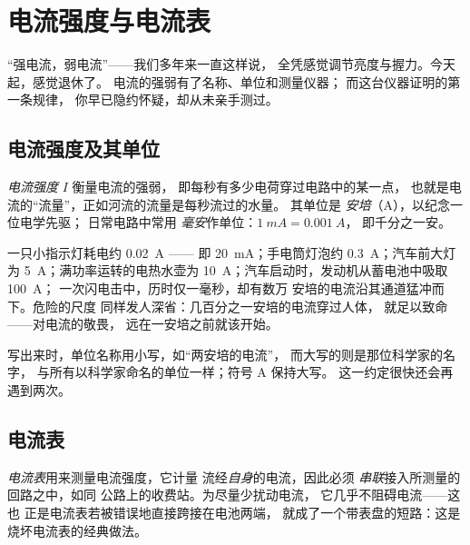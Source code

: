 \chapter{电流强度与电流表}\label{ch:g8:intensity-ammeter}

“强电流，弱电流”——我们多年来一直这样说，
全凭感觉调节亮度与握力。今天起，感觉退休了。
电流的强弱有了名称、单位和测量仪器；
而这台仪器证明的第一条规律，
你早已隐约怀疑，却从未亲手测过。

\section{电流强度及其单位}

\begin{definition}[电流强度]\label{def:g8:intensity-ammeter:intensity}
\emph{电流强度} $I$ 衡量电流的强弱，
即每秒有多少电荷穿过电路中的某一点，
也就是电流的“流量”，正如河流的流量是每秒流过的水量。
其单位是
\emph{安培}（\unit{A}），以纪念一位电学先驱；
日常电路中常用
\emph{毫安}作单位：$\qty{1}{mA} = \qty{0.001}{A}$，
即千分之一安。
\end{definition}

\begin{example}[常见电流的大小]\label{ex:g8:intensity-ammeter:values}
一只小指示灯耗电约 \qty{0.02}{A} ——
即 \qty{20}{mA}；手电筒灯泡约 \qty{0.3}{A}；汽车前大灯为
\qty{5}{A}；满功率运转的电热水壶为
\qty{10}{A}；汽车启动时，发动机从蓄电池中吸取 \qty{100}{A}；
一次闪电击中，历时仅一毫秒，却有数万
安培的电流沿其通道猛冲而下。危险的尺度
同样发人深省：几百分之一安培的电流穿过人体，
就足以致命——对电流的敬畏，
远在一安培之前就该开始。
\end{example}

\begin{remark}[人名与单位]\label{rem:g8:intensity-ammeter:person}
写出来时，单位名称用小写，如“两安培的电流”，
而大写的则是那位科学家的名字，
与所有以科学家命名的单位一样；符号 \unit{A} 保持大写。
这一约定很快还会再遇到两次。
\end{remark}

\section{电流表}

\begin{definition}[电流表]\label{def:g8:intensity-ammeter:ammeter}
\emph{电流表}用来测量电流强度，它计量
流经\emph{自身}的电流，因此必须
\emph{串联}接入所测量的回路之中，如同
公路上的收费站。为尽量少扰动电流，
它几乎不阻碍电流——这也
正是电流表若被错误地直接跨接在电池两端，
就成了一个带表盘的短路：这是烧坏电流表的经典做法。
\end{definition}

